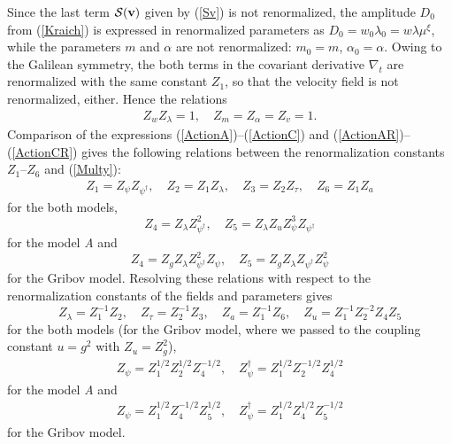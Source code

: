 \documentclass[12pt]{article}
\def\S{{\cal S}}
\def\bfv{{\bf v}}
\begin{document}
Since the last term $\S(\bfv)$ given by (\ref{Sv}) is not renormalized,
the amplitude $D_{0}$ from (\ref{Kraich}) is expressed in renormalized
parameters as $D_{0} = w_{0} \lambda_{0}  = w\lambda \mu^{\xi}$, while
the parameters $m$ and $\alpha$ are not renormalized: $m_{0} = m$,
$\alpha_{0} = \alpha$. Owing to the Galilean symmetry, the both terms
in the covariant derivative $\nabla_{t}$ are renormalized with the same
constant $Z_{1}$, so that the velocity field is not renormalized, either.
Hence the relations
\begin{eqnarray}
Z_{w}Z_{\lambda} =1, \quad Z_{m}= Z_{\alpha} = Z_{v} =1.
\label{RenD}
\end{eqnarray}
Comparison of the expressions (\ref{ActionA})--(\ref{ActionC}) and
(\ref{ActionAR})--(\ref{ActionCR}) gives the following relations between
the renormalization constants $Z_{1}$--$Z_{6}$ and (\ref{Multy}):
\begin{eqnarray}
Z_{1} = Z_{\psi} Z_{\psi^{\dagger}}, \quad Z_{2} = Z_{1}Z_{\lambda}, \quad
Z_{3} = Z_{2} Z_{\tau}, \quad Z_{6} = Z_{1} Z_{a}
\label{ZZ}
\end{eqnarray}
for the both models,
\begin{equation}
Z_{4} = Z_{\lambda} Z_{\psi^{\dagger}}^{2}, \quad
Z_{5} = Z_{\lambda}Z_{u} Z_{\psi}^{3} Z_{\psi^{\dagger}}
\label{ZA}
\end{equation}
for the model {\it A} and
\begin{equation}
Z_{4} = Z_{g} Z_{\lambda} Z_{\psi^{\dagger}}^{2} Z_{\psi},
\quad Z_{5} = Z_{g} Z_{\lambda} Z_{\psi^{\dagger}} Z_{\psi}^{2}
\label{ZG}
\end{equation}
for the Gribov model.
Resolving these relations with respect to the renormalization constants
of the fields and parameters gives
\begin{equation}
Z_{\lambda} = Z_{1}^{-1} Z_{2}, \quad Z_{\tau} = Z_{2}^{-1} Z_{3}, \quad
Z_{a} = Z_{1}^{-1} Z_{6}, \quad
Z_{u} = Z_{1}^{-1} Z_{2}^{-2} Z_{4} Z_{5}
\label{ResoC}
\end{equation}
for the both models (for the Gribov model, where we passed to the coupling
constant $u=g^{2}$ with $Z_{u}=Z_{g}^{2}$),
\begin{eqnarray}
Z_{\psi}= Z_{1}^{1/2}Z_{2}^{1/2}Z_{4}^{-1/2}, \quad
Z_{\psi}^{\dag}= Z_{1}^{1/2}Z_{2}^{-1/2}Z_{4}^{1/2}
\label{ResoA}
\end{eqnarray}
for the model {\it A} and
\begin{eqnarray}
Z_{\psi}= Z_{1}^{1/2}Z_{4}^{-1/2}Z_{5}^{1/2}, \quad
Z_{\psi}^{\dag}= Z_{1}^{1/2}Z_{4}^{1/2}Z_{5}^{-1/2}
\label{ResoG}
\end{eqnarray}
for the Gribov model.
\end{document}
